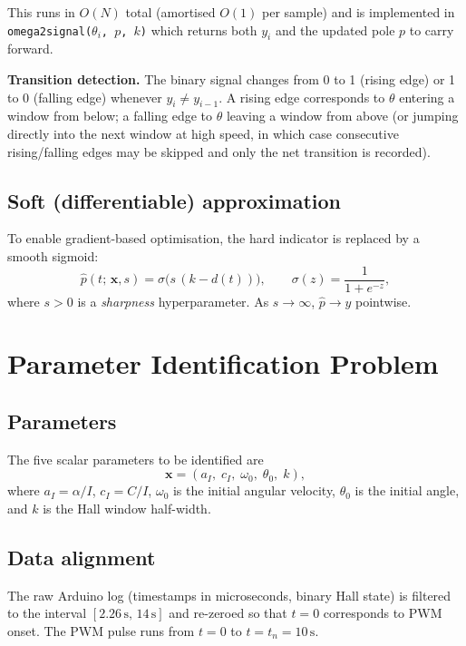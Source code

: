 \documentclass[11pt,a4paper]{article}
\begin{document}
This runs in $O(N)$ total (amortised $O(1)$ per sample) and is implemented
in \texttt{omega2signal($\theta_i$, $p$, $k$)} which returns both $y_i$ and
the updated pole $p$ to carry forward.

\textbf{Transition detection.}
The binary signal changes from 0 to 1 (rising edge) or 1 to 0 (falling
edge) whenever $y_i \neq y_{i-1}$.  A rising edge corresponds to $\theta$
entering a window from below; a falling edge to $\theta$ leaving a window
from above (or jumping directly into the next window at high speed, in which
case consecutive rising/falling edges may be skipped and only the net
transition is recorded).

\subsection{Soft (differentiable) approximation}
To enable gradient-based optimisation, the hard indicator is replaced by a
smooth sigmoid:
\begin{equation}\label{eq:hall_soft}
  \hat{p}(t;\,\mathbf{x},s)
  = \sigma\!\bigl(s\,(k - d(t))\bigr), \qquad
  \sigma(z) = \frac{1}{1+e^{-z}},
\end{equation}
where $s>0$ is a \emph{sharpness} hyperparameter.
As $s\to\infty$, $\hat{p}\to y$ pointwise.

\section{Parameter Identification Problem}

\subsection{Parameters}
The five scalar parameters to be identified are
\[
  \mathbf{x} = (a_I,\; c_I,\; \omega_0,\; \theta_0,\; k),
\]
where $a_I = \alpha/I$, $c_I = C/I$, $\omega_0$ is the initial angular
velocity, $\theta_0$ is the initial angle, and $k$ is the Hall window
half-width.

\subsection{Data alignment}
The raw Arduino log (timestamps in microseconds, binary Hall state) is
filtered to the interval $[2.26\,\text{s},\,14\,\text{s}]$ and re-zeroed
so that $t=0$ corresponds to PWM onset.  The PWM pulse runs from $t=0$ to
$t=t_n=10\,\text{s}$.
\end{document}
